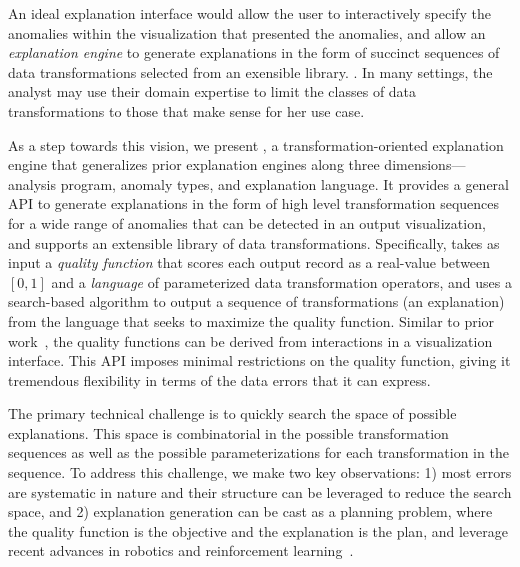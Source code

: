 An ideal explanation interface would allow the user to interactively specify the anomalies within the visualization that presented the anomalies, and allow an {\it explanation engine} to generate explanations in the form of succinct sequences of data transformations selected from an exensible library. .  In many settings, the analyst may use their domain expertise to limit the classes of data transformations to those that make sense for her use case.  



As a step towards this vision,  we present \sys, a transformation-oriented explanation engine that generalizes prior explanation engines along three dimensions---analysis program, anomaly types, and explanation language. 
It provides a general API to generate explanations in the form of high level transformation sequences for a wide range of anomalies that can be detected in an output visualization, and supports an extensible library of data transformations.
Specifically, \sys takes as input a {\it quality function} that scores each output record as a real-value between $[0,1]$ and a {\it language} of parameterized data transformation operators, and uses a search-based algorithm to output a sequence of transformations (an explanation) from the language that seeks to maximize the quality function.  Similar to prior work~\cite{scorpion}, the quality functions can be derived from interactions in a visualization interface.    This API imposes minimal restrictions on the quality function, giving it tremendous flexibility in terms of the data errors that it can express.   

The primary technical challenge is to quickly search the space of possible explanations.  This space is combinatorial in the possible transformation sequences as well as the possible parameterizations for each transformation in the sequence.  
To address this challenge, we make two key observations: 1) most errors are systematic in nature and their structure can be leveraged to reduce the search space, and 2) explanation generation can be cast as a planning problem, where the quality function is the objective and the explanation is the plan,  and leverage recent advances in robotics and reinforcement learning~\cite{}.

